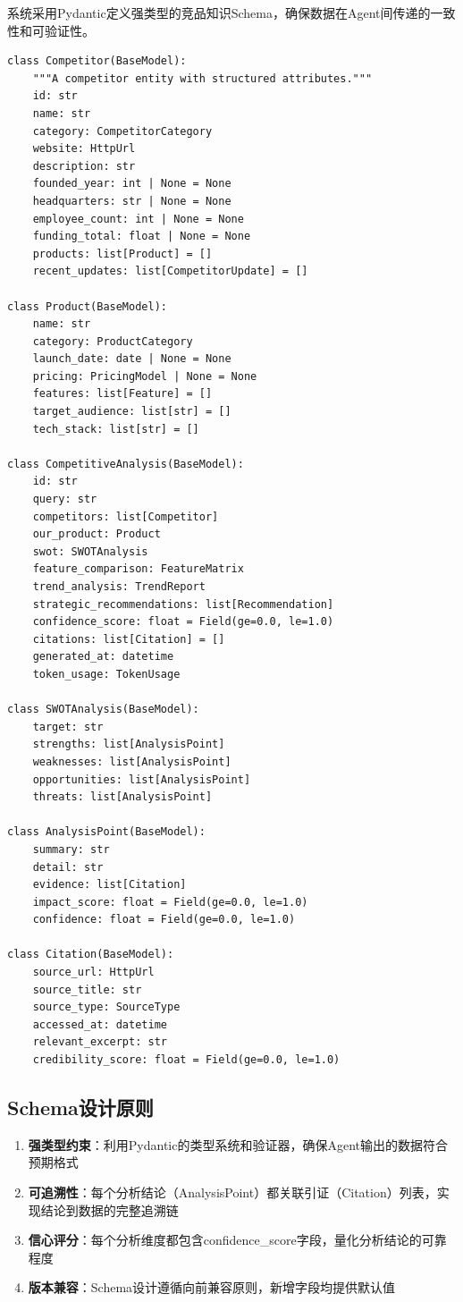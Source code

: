 \documentclass[12pt,a4paper]{ctexrep}
\begin{document}
系统采用Pydantic\cite{pydantic2024}定义强类型的竞品知识Schema，确保数据在Agent间传递的一致性和可验证性。

\begin{lstlisting}[language=Python3,caption=竞品知识Schema核心模型,label=lst:schema]
class Competitor(BaseModel):
    """A competitor entity with structured attributes."""
    id: str
    name: str
    category: CompetitorCategory
    website: HttpUrl
    description: str
    founded_year: int | None = None
    headquarters: str | None = None
    employee_count: int | None = None
    funding_total: float | None = None
    products: list[Product] = []
    recent_updates: list[CompetitorUpdate] = []

class Product(BaseModel):
    name: str
    category: ProductCategory
    launch_date: date | None = None
    pricing: PricingModel | None = None
    features: list[Feature] = []
    target_audience: list[str] = []
    tech_stack: list[str] = []

class CompetitiveAnalysis(BaseModel):
    id: str
    query: str
    competitors: list[Competitor]
    our_product: Product
    swot: SWOTAnalysis
    feature_comparison: FeatureMatrix
    trend_analysis: TrendReport
    strategic_recommendations: list[Recommendation]
    confidence_score: float = Field(ge=0.0, le=1.0)
    citations: list[Citation] = []
    generated_at: datetime
    token_usage: TokenUsage

class SWOTAnalysis(BaseModel):
    target: str
    strengths: list[AnalysisPoint]
    weaknesses: list[AnalysisPoint]
    opportunities: list[AnalysisPoint]
    threats: list[AnalysisPoint]

class AnalysisPoint(BaseModel):
    summary: str
    detail: str
    evidence: list[Citation]
    impact_score: float = Field(ge=0.0, le=1.0)
    confidence: float = Field(ge=0.0, le=1.0)

class Citation(BaseModel):
    source_url: HttpUrl
    source_title: str
    source_type: SourceType
    accessed_at: datetime
    relevant_excerpt: str
    credibility_score: float = Field(ge=0.0, le=1.0)
\end{lstlisting}

\subsection{Schema设计原则}

\begin{enumerate}[leftmargin=2em]
\item \textbf{强类型约束}：利用Pydantic的类型系统和验证器，确保Agent输出的数据符合预期格式
\item \textbf{可追溯性}：每个分析结论（AnalysisPoint）都关联引证（Citation）列表，实现结论到数据的完整追溯链
\item \textbf{信心评分}：每个分析维度都包含confidence\_score字段，量化分析结论的可靠程度
\item \textbf{版本兼容}：Schema设计遵循向前兼容原则，新增字段均提供默认值
\end{enumerate}
\end{document}
